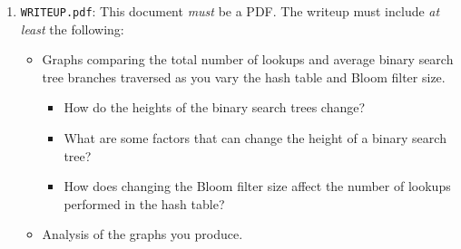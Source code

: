\begin{enumerate}
  \item \texttt{WRITEUP.pdf}: This document \emph{must} be a PDF. The
    writeup must include \emph{at least} the following:
    \begin{itemize}
      \item Graphs comparing the total number of lookups and average
        binary search tree branches traversed as you vary the hash table
        and Bloom filter size.
        \begin{itemize}
          \item How do the heights of the binary search trees change?
          \item What are some factors that can change the height of a
            binary search tree?
          \item How does changing the Bloom filter size affect the
            number of lookups performed in the hash table?
        \end{itemize}
      \item Analysis of the graphs you produce.
    \end{itemize}
\end{enumerate}
